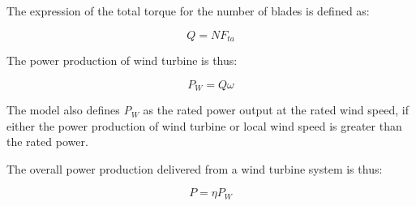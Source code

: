The expression of the total torque for the number of blades is defined as:

\begin{equation}
Q = N{F_{ta}}
\end{equation}

The power production of wind turbine is thus:

\begin{equation}
{P_W} = Q\omega
\end{equation}

The model also defines \emph{P\(_{W}\)} as the rated power output at the rated wind speed, if either the power production of wind turbine or local wind speed is greater than the rated power.

The overall power production delivered from a wind turbine system is thus:

\begin{equation}
P = \eta {P_W}
\end{equation}

